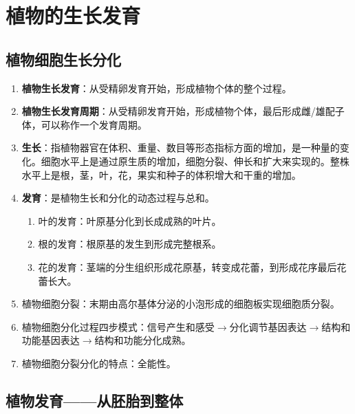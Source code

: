 \chapter{植物的生长发育}
\section{植物细胞生长分化}
\begin{enumerate}
    \item \textbf{植物生长发育}：从受精卵发育开始，形成植物个体的整个过程。
    \item \textbf{植物生长发育周期}：从受精卵发育开始，形成植物个体，最后形成雌/雄配子体，可以称作一个发育周期。
    \item \textbf{生长}：指植物器官在体积、重量、数目等形态指标方面的增加，是一种量的变化。细胞水平上是通过原生质的增加，细胞分裂、伸长和扩大来实现的。整株水平上是根，茎，叶，花，果实和种子的体积增大和干重的增加。
    \item \textbf{发育}：是植物生长和分化的动态过程与总和。
    \begin{enumerate}
        \item 叶的发育：叶原基分化到长成成熟的叶片。
        \item 根的发育：根原基的发生到形成完整根系。
        \item 花的发育：茎端的分生组织形成花原基，转变成花蕾，到形成花序最后花蕾长大。
    \end{enumerate}
    \item 植物细胞分裂：末期由高尔基体分泌的小泡形成的细胞板实现细胞质分裂。
    \item 植物细胞分化过程四步模式：信号产生和感受$\to$分化调节基因表达$\to$结构和功能基因表达$\to$结构和功能分化成熟。
    \item 植物细胞分裂分化的特点：全能性。
\end{enumerate}

\section{植物发育——从胚胎到整体}
